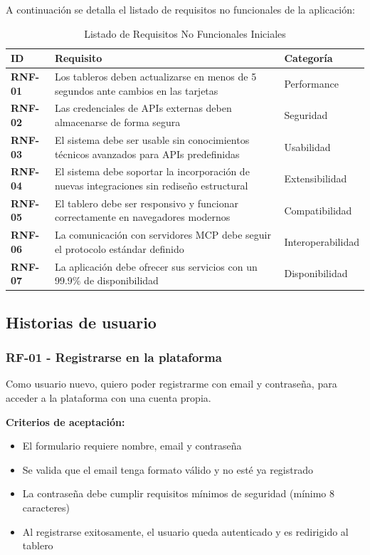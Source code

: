 A continuación se detalla el listado de requisitos no funcionales de la aplicación:

\begin{table}[H]
  \centering
  \renewcommand{\arraystretch}{1.2}
  \begin{tabularx}{\textwidth}{>{\bfseries}l X l}
    \toprule
    ID & Requisito & Categoría \\
    \midrule
    RNF-01 & Los tableros deben actualizarse en menos de 5 segundos ante cambios en las tarjetas & Performance \\
    RNF-02 & Las credenciales de APIs externas deben almacenarse de forma segura & Seguridad \\
    RNF-03 & El sistema debe ser usable sin conocimientos técnicos avanzados para APIs predefinidas & Usabilidad \\
    RNF-04 & El sistema debe soportar la incorporación de nuevas integraciones sin rediseño estructural & Extensibilidad \\
    RNF-05 & El tablero debe ser responsivo y funcionar correctamente en navegadores modernos & Compatibilidad \\
    RNF-06 & La comunicación con servidores MCP debe seguir el protocolo estándar definido & Interoperabilidad \\
    RNF-07 & La aplicación debe ofrecer sus servicios con un 99.9\% de disponibilidad & Disponibilidad \\
    \bottomrule
  \end{tabularx}
  \caption{Listado de Requisitos No Funcionales Iniciales}
  \label{tab:rnf_iniciales}
\end{table}

\subsection{Historias de usuario}

\subsubsection*{RF-01 - Registrarse en la plataforma}
Como usuario nuevo, quiero poder registrarme con email y contraseña, para acceder a la plataforma con una cuenta propia.

\textbf{Criterios de aceptación:}
\begin{itemize}
  \item El formulario requiere nombre, email y contraseña
  \item Se valida que el email tenga formato válido y no esté ya registrado
  \item La contraseña debe cumplir requisitos mínimos de seguridad (mínimo 8 caracteres)
  \item Al registrarse exitosamente, el usuario queda autenticado y es redirigido al tablero
\end{itemize}

